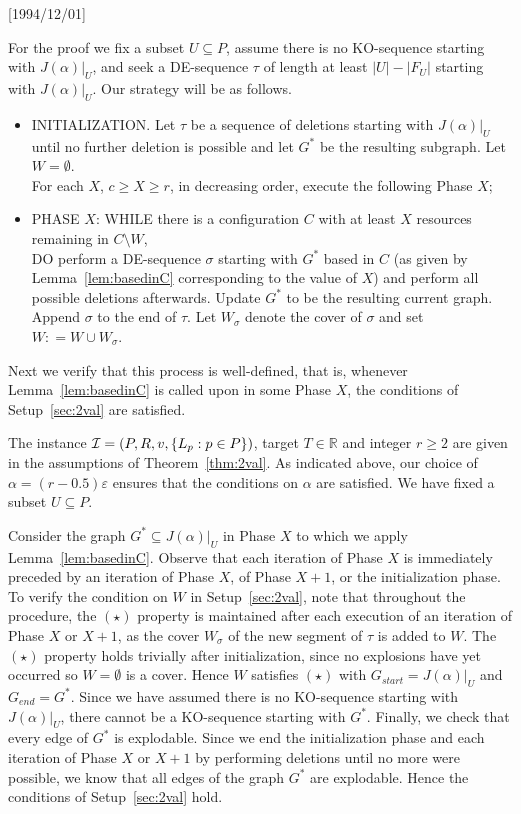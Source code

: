 \NeedsTeXFormat{LaTeX2e}[1994/12/01]\documentclass[letterpaper, 11pt]{article}
\theoremstyle{definition}
\theoremstyle{remark}
\numberwithin{equation}{section}
\newcommand{\veps}{\varepsilon}
\begin{document}
For the proof we fix a subset $U\subseteq P$, 
assume there is no KO-sequence starting with $J(\alpha)|_U$, and seek
a DE-sequence $\tau$ of length at least $|U| - |F_U|$ starting with
$J(\alpha)|_U$.  Our strategy will be as follows. 
\begin{itemize}
\item[] {\small INITIALIZATION.} Let $\tau$ be a sequence of deletions
  starting with $J(\alpha)|_U$ until no further deletion is possible and
  let $G^*$ be the resulting subgraph. Let $W=\emptyset$. 
  \\[1mm]
  For each $X$, $c\geq X\geq r$, in
 decreasing order, execute the following Phase $X$;
\item[] {\small PHASE $X$:} {\small WHILE} there is a configuration $C$
  with at least $X$    resources remaining in $C\setminus W$, \\
  {\small DO} perform a DE-sequence $\sigma$ starting with $G^*$ based
in $C$ (as given by Lemma~\ref{lem:basedinC} corresponding to the value 
of $X$) and perform all possible deletions afterwards. Update $G^*$ to be the resulting current graph. 
Append $\sigma$ to the end of $\tau$.
Let $W_{\sigma}$ denote the cover of $\sigma$ and set $W: = W \cup W_{\sigma}$.
\end{itemize}


Next we verify that this process is well-defined, that is,
whenever Lemma~\ref{lem:basedinC} is called upon in
some Phase $X$, the conditions of Setup~\ref{sec:2val} are satisfied.

The instance ${\cal I} = (P, R , v, \{L_p : p\in P\})$, target $T\in \mathbb{R}$
and integer $r\geq 2$ are given in the assumptions of
Theorem~\ref{thm:2val}. As indicated above, our choice of $\alpha=(r-0.5)\veps$ ensures that
the conditions on $\alpha$ are satisfied. We have fixed a subset
$U\subseteq P$.

Consider the graph $G^*\subseteq J(\alpha)|_U$ in Phase $X$ to
which we apply Lemma~\ref{lem:basedinC}. Observe that each iteration
of Phase $X$ is immediately preceded by an 
iteration of Phase $X$, of Phase $X+1$, or the initialization
phase. To verify the condition on $W$ in
Setup~\ref{sec:2val}, note that throughout the procedure, the $(\star)$ property
is maintained after each execution of an iteration of Phase $X$ or $X+1$, as
the cover $W_{\sigma}$ of the new segment of $\tau$ is added to
$W$. The $(\star)$ property holds trivially after initialization,
since no explosions 
have yet occurred so $W=\emptyset$ is a cover. Hence $W$ satisfies $(\star)$
with $G_{start}=J(\alpha)|_U$ and $G_{end}=G^*$. Since we have assumed there is
no KO-sequence starting with $J(\alpha)|_U$, there cannot be a
KO-sequence starting with $G^*$. Finally, we check that every edge of
$G^*$ is explodable. Since we end the initialization phase and each
iteration of Phase $X$ or $X+1$ by performing deletions until no more were
possible, we know that all edges of the graph $G^*$ are explodable. Hence the conditions of Setup~\ref{sec:2val} hold.
\end{document}
